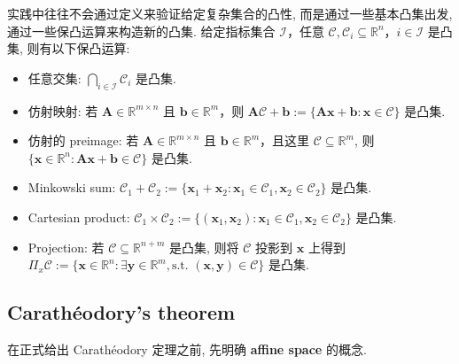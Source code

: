 \begin{propositionblock}[{保凸运算}]
实践中往往不会通过定义来验证给定复杂集合的凸性, 而是通过一些基本凸集出发, 通过一些保凸运算来构造新的凸集. 给定指标集合 $\mathcal{I}$，任意 $\mathcal{C}, \mathcal{C}_i \subseteq \mathbb{R}^n$，$i \in \mathcal{I}$ 是凸集, 则有以下保凸运算:

\begin{itemize}
\item {}任意交集: $\bigcap_{i \in \mathcal{I}} \mathcal{C}_i$ 是凸集.


\item {}仿射映射: 若 $\bm{A} \in \mathbb{R}^{m \times n}$ 且 $\bm{b} \in \mathbb{R}^m$，则 $\bm{A}\mathcal{C} + \bm{b} := \{\bm{A}\bm{x} + \bm{b}: \bm{x} \in \mathcal{C}\}$ 是凸集.


\item {}仿射的 preimage: 若 $\bm{A} \in \mathbb{R}^{m \times n}$ 且 $\bm{b} \in \mathbb{R}^m$，且这里 $\mathcal{C} \subseteq \mathbb{R}^m$, 则 $\{\bm{x} \in \mathbb{R}^n: \bm{A}\bm{x} + \bm{b} \in \mathcal{C}\}$ 是凸集.


\item {}Minkowski sum: $\mathcal{C}_1 + \mathcal{C}_2 := \{\bm{x}_1 + \bm{x}_2: \bm{x}_1 \in \mathcal{C}_1, \bm{x}_2 \in \mathcal{C}_2\}$ 是凸集.


\item {}Cartesian product: $\mathcal{C}_1 \times \mathcal{C}_2 := \{(\bm{x}_1, \bm{x}_2): \bm{x}_1 \in \mathcal{C}_1, \bm{x}_2 \in \mathcal{C}_2\}$ 是凸集.


\item {}Projection: 若 $\mathcal{C} \subseteq \mathbb{R}^{n+m}$ 是凸集, 则将 $\mathcal{C}$ 投影到 $\bm{x}$ 上得到 $\Pi_x \mathcal{C} := \{\bm{x} \in \mathbb{R}^n:  \exists \bm{y} \in \mathbb{R}^m, \text{s.t. } (\bm{x}, \bm{y}) \in \mathcal{C}\}$ 是凸集.


\end{itemize}

\end{propositionblock}

\subsection{Carathéodory's theorem}

在正式给出 Carathéodory 定理之前, 先明确 \textbf{affine space} 的概念.


